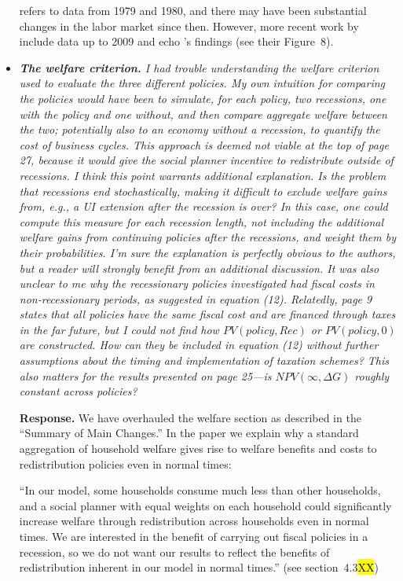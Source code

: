 \documentclass[12pt,letterpaper,english]{article}
\begin{document}
\begin{itemize}
	\citet{mincer1991education} refers to data from 1979 and 1980, and there may have been substantial changes in the labor market since then. However, more recent work by \citet{elsby2010labor} include data up to 2009 and echo \citeauthor{mincer1991education}'s findings (see their Figure~8).

	\item \textit{\textbf{The welfare criterion.} I had trouble understanding the welfare criterion used to evaluate the three different policies. My own intuition for comparing the policies would have been to simulate, for each policy, two recessions, one with the policy and one without, and then compare aggregate	welfare between the two; potentially also to an economy without a recession, to quantify the cost of business cycles. This approach is deemed not viable at the top of page 27, because		it would give the social planner incentive to redistribute outside of recessions. I think this point warrants additional explanation. Is the problem that recessions end stochastically, making it difficult to exclude welfare gains from, e.g., a UI extension after the recession is over? In this case, one could compute this measure for each recession length, not including the additional welfare gains from continuing policies after the recessions, and weight them by their probabilities. I’m sure the explanation is perfectly obvious to the authors, but a reader will strongly benefit from an additional discussion. It was also unclear to me why the recessionary policies investigated had fiscal costs in non-recessionary periods, as suggested	in equation (12). Relatedly, page 9 states that all policies have the same fiscal cost and are financed through taxes in the far future, but I could not find how $PV(policy,Rec)$ 	or $PV(policy, 0)$ are constructed. How can they be included in equation (12) without further	assumptions about the timing and implementation of taxation schemes? This also matters for the results presented on page 25—is $NPV(\infty,\Delta G)$ roughly constant across policies?}

	\noindent \textbf{Response.} We have overhauled the welfare section as described in the ``Summary of Main Changes.'' In the paper we explain why a standard aggregation of household welfare gives rise to welfare benefits and costs to redistribution policies even in normal times:
	
	``In our model, some households consume much less than other households, and a social planner with equal weights on each household could significantly increase welfare through redistribution across households even in normal times. We are interested in the benefit of carrying out fiscal policies in a recession, so we do not want our results to reflect the benefits of redistribution inherent in our model in normal times.'' (see section~4.3\hl{XX})
	

\end{itemize}
\end{document}
